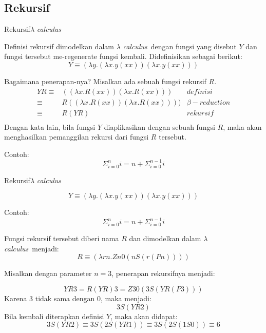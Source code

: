 \documentclass[aspectratio=1610,10pt,handout]{beamer}
\newcommand{\lc}{$\lambda$ {\it calculus}\ }
\begin{document}
\subsection{Rekursif}
\begin{frame}{Rekursif}{\lc}

	Definisi rekursif dimodelkan dalam \lc dengan fungsi yang disebut $Y$ dan fungsi tersebut me-regenerate fungsi kembali. Didefinisikan sebagai berikut:
	$$ Y \equiv  (\lambda y.(\lambda x.y(xx))(\lambda x.y(xx))) $$

	Bagaimana penerapan-nya? Misalkan ada sebuah fungsi rekursif $R$.
	\[
	\begin{array}{rlr}
	YR \equiv  &  ((\lambda x.R(xx))(\lambda x.R(xx)))  &  definisi \\
	     \equiv  & R((\lambda x.R(xx))(\lambda x.R(xx)))) & \beta-reduction \\
	     \equiv  & R(YR) & rekursif \\
	 \end{array}
	\]
	Dengan kata lain, bila fungsi $Y$ diaplikasikan dengan sebuah fungsi $R$, maka akan menghasilkan pemanggilan rekursi dari fungsi $R$ tersebut.

	Contoh:
	$$ \Sigma_{i=0}^n i = n + \Sigma_{i=0}^{n-1} i  $$
\end{frame}

\begin{frame}{Rekursif}{\lc}


	$$ Y \equiv  (\lambda y.(\lambda x.y(xx))(\lambda x.y(xx))) $$

	Contoh:
	$$ \Sigma_{i=0}^n i = n + \Sigma_{i=0}^{n-1} i  $$
	\pause

	Fungsi rekursif tersebut diberi nama $R$ dan dimodelkan dalam \lc menjadi:
	$$ R \equiv  (\lambda rn.Zn0(nS(r(Pn)))) $$

	\pause
	Misalkan dengan parameter $n=3$, penerapan rekursifnya menjadi:

	$$YR3 = R(YR)3 = Z30(3S(YR(P3)))$$
	\pause
	Karena 3 tidak sama dengan 0, maka menjadi:
	$$3S(YR2)$$
	\pause
	Bila kembali diterapkan definisi $Y$, maka akan didapat:
	$$3S(YR2) \equiv 3S(2S(YR1)) \equiv 3S(2S(1S0)) \equiv 6 $$



\end{frame}

%
%
\end{document}
